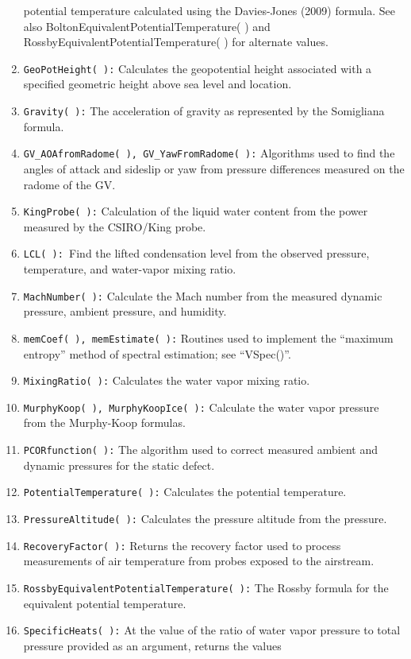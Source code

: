 \documentclass[12pt,english]{report}\usepackage[]{graphicx}\usepackage[]{color}
\begin{document}
\begin{enumerate}
potential temperature calculated using the Davies-Jones (2009) formula.
See also BoltonEquivalentPotentialTemperature( ) and RossbyEquivalentPotentialTemperature(
) for alternate values.
\item \texttt{GeoPotHeight( ):} Calculates the geopotential height associated
with a specified geometric height above sea level and location.
\item \texttt{Gravity( ):} The acceleration of gravity as represented by
the Somigliana formula.
\item \texttt{GV\_AOAfromRadome( ), GV\_YawFromRadome( ):} Algorithms used
to find the angles of attack and sideslip or yaw from pressure differences
measured on the radome of the GV.
\item \texttt{KingProbe( ):} Calculation of the liquid water content from
the power measured by the CSIRO/King probe.
\item \texttt{LCL( ): }Find the lifted condensation level from the observed
pressure, temperature, and water-vapor mixing ratio.
\item \texttt{MachNumber( ):} Calculate the Mach number from the measured
dynamic pressure, ambient pressure, and humidity.
\item \texttt{memCoef( ), memEstimate( ):} Routines used to implement the
``maximum entropy'' method of spectral estimation; see ``VSpec()''.
\item \texttt{MixingRatio( ):} Calculates the water vapor mixing ratio.
\item \texttt{MurphyKoop( ), MurphyKoopIce( ):} Calculate the water vapor
pressure from the Murphy-Koop formulas.
\item \texttt{PCORfunction( ):} The algorithm used to correct measured ambient
and dynamic pressures for the static defect.
\item \texttt{PotentialTemperature( ):} Calculates the potential temperature.
\item \texttt{PressureAltitude( ):} Calculates the pressure altitude from
the pressure.
\item \texttt{RecoveryFactor( ):} Returns the recovery factor used to process
measurements of air temperature from probes exposed to the airstream.
\item \texttt{RossbyEquivalentPotentialTemperature( ):} The Rossby formula
for the equivalent potential temperature.
\item \texttt{SpecificHeats( ):} At the value of the ratio of water vapor
pressure to total pressure provided as an argument, returns the values

\end{enumerate}
\end{document}
